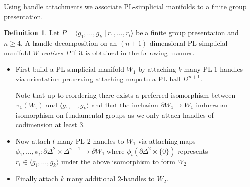 \documentclass[a4paper, reqno]{amsart}
\newtheorem{lemma}[proposition]{Lemma}
\theoremstyle{definition}
\newtheorem{definition}[proposition]{Definition}
\theoremstyle{remark}
\newcommand{\comm}[2]{%
  {\color{red}#1: #2}}
\renewcommand{\~}{\nobreak\ }
\begin{document}
Using handle attachments we associate PL-simplicial manifolds to a finite group presentation.  
\begin{definition}\label{dfn:relalizeP}
    Let  $P=\langle g_1,\dots, g_k\mid r_1,\dots, r_l\rangle$ be a finite group presentation and $n\geq4$. A handle decomposition on an $(n+1)$-dimensional PL-simplicial manifold $W$ \emph{realizes $P$} if it is obtained in the following manner:
    \begin{itemize}
        \item First build a PL-simplicial manifold $W_1$ by attaching $k$ many PL 1-handles via orientation-preserving attaching maps to a PL-ball $D^{n+1}$. 

        Note that up to reordering there exists a preferred isomorphism between $\pi_1(W_1)$ and $\langle g_1,\dots, g_k\rangle$ and that the inclusion $\partial W_1\to W_1$ induces an isomorphism on fundamental groups as we only attach handles of codimension at least 3. 
        \item Now attach $l$ many PL 2-handles to $W_1$ via attaching maps $\phi_1,\dots,\phi_l\colon\partial\Delta^2\times \Delta^{n-1}\to\partial W_1$ where $\phi_i(\partial \Delta^2\times\{0\})$ represents $r_i\in\langle g_1,\dots,g_k\rangle$ under the above isomorphism to form $W_2$
        \item Finally attach $k$ many additional 2-handles to $W_2$. %
    \end{itemize}
\end{definition}
\end{document}
